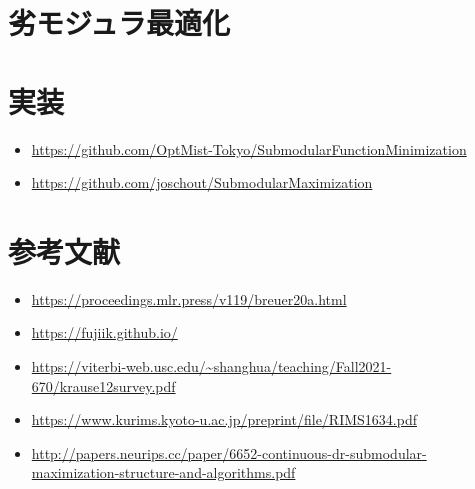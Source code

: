 \documentclass{classes/report}
\begin{document}
\chapter{劣モジュラ最適化}

\chapter{実装}

\begin{itemize}
    \item \url{https://github.com/OptMist-Tokyo/SubmodularFunctionMinimization}
    \item \url{https://github.com/joschout/SubmodularMaximization}
\end{itemize}

\chapter{参考文献}

\begin{itemize}
    \item \url{https://proceedings.mlr.press/v119/breuer20a.html}
    \item \url{https://fujiik.github.io/}
    \item \url{https://viterbi-web.usc.edu/~shanghua/teaching/Fall2021-670/krause12survey.pdf}
    \item \url{https://www.kurims.kyoto-u.ac.jp/preprint/file/RIMS1634.pdf}
    \item \url{http://papers.neurips.cc/paper/6652-continuous-dr-submodular-maximization-structure-and-algorithms.pdf}
\end{itemize}
\end{document}
